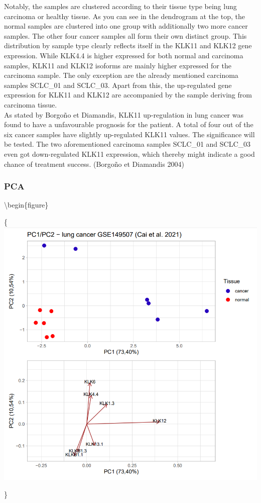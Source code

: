 \documentclass[
]{article}
\begin{document}
Notably, the samples are clustered according to their tissue type being
lung carcinoma or healthy tissue. As you can see in the dendrogram at
the top, the normal samples are clustered into one group with
additionally two more cancer samples. The other four cancer samples all
form their own distinct group. This distribution by sample type clearly
reflects itself in the KLK11 and KLK12 gene expression. While KLK4.4 is
higher expressed for both normal and carcinoma samples, KLK11 and KLK12
isoforms are mainly higher expressed for the carcinoma sample. The only
exception are the already mentioned carcinoma samples SCLC\_01 and
SCLC\_03. Apart from this, the up-regulated gene expression for KLK11
and KLK12 are accompanied by the sample deriving from carcinoma
tissue.\\
As stated by Borgoño et Diamandis, KLK11 up-regulation in lung cancer
was found to have a unfavourable prognosis for the patient. A total of
four out of the six cancer samples have slightly up-regulated KLK11
values. The significance will be tested. The two aforementioned
carcinoma samples SCLC\_01 and SCLC\_03 even got down-regulated KLK11
expression, which thereby might indicate a good chance of treatment
success. (Borgoño et Diamandis 2004)

\hypertarget{pca-1}{%
\subsubsection{PCA}\label{pca-1}}

\textbackslash begin\{figure\}

\{\centering \includegraphics[width=0.5\linewidth]{images/PCAplot_lung}

\}
\end{document}

